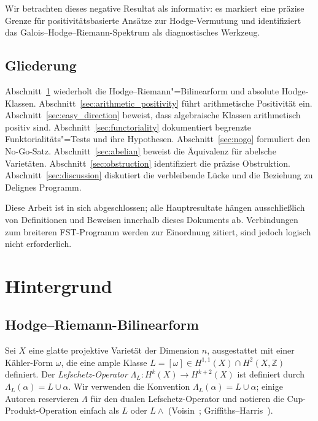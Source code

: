\documentclass[aps,prd,twocolumn,superscriptaddress,nofootinbib]{revtex4-2}
\theoremstyle{definition}
\theoremstyle{remark}
\begin{document}
Wir betrachten dieses negative Resultat als informativ: es markiert eine präzise Grenze für positivitätsbasierte Ansätze zur Hodge-Vermutung und identifiziert das Galois--Hodge--Riemann-Spektrum als diagnostisches Werkzeug.

\subsection{Gliederung}

Abschnitt~\ref{sec:background} wiederholt die Hodge--Riemann"=Bilinearform und absolute Hodge-Klassen. Abschnitt~\ref{sec:arithmetic_positivity} führt arithmetische Positivität ein. Abschnitt~\ref{sec:easy_direction} beweist, dass algebraische Klassen arithmetisch positiv sind. Abschnitt~\ref{sec:functoriality} dokumentiert begrenzte Funktorialitäts"=Tests und ihre Hypothesen. Abschnitt~\ref{sec:nogo} formuliert den No-Go-Satz. Abschnitt~\ref{sec:abelian} beweist die Äquivalenz für abelsche Varietäten. Abschnitt~\ref{sec:obstruction} identifiziert die präzise Obstruktion. Abschnitt~\ref{sec:discussion} diskutiert die verbleibende Lücke und die Beziehung zu Delignes Programm.

Diese Arbeit ist in sich abgeschlossen; alle Hauptresultate hängen ausschließlich von Definitionen und Beweisen innerhalb dieses Dokuments ab. Verbindungen zum breiteren FST-Programm werden zur Einordnung zitiert, sind jedoch logisch nicht erforderlich.


\section{Hintergrund}
\label{sec:background}

\subsection{Hodge--Riemann-Bilinearform}

Sei $X$ eine glatte projektive Varietät der Dimension $n$, ausgestattet mit einer Kähler-Form $\omega$, die eine ample Klasse $L = [\omega] \in H^{1,1}(X) \cap H^2(X, \mathbb{Z})$ definiert. Der \textit{Lefschetz-Operator} $\Lambda_L: H^k(X) \to H^{k+2}(X)$ ist definiert durch $\Lambda_L(\alpha) = L \cup \alpha$. Wir verwenden die Konvention $\Lambda_L(\alpha) = L \cup \alpha$; einige Autoren reservieren $\Lambda$ für den dualen Lefschetz-Operator und notieren die Cup-Produkt-Operation einfach als $L$ oder $L \wedge$ (Voisin~\cite{Voisin2002}; Griffiths--Harris~\cite{GH1978}).
\end{document}
